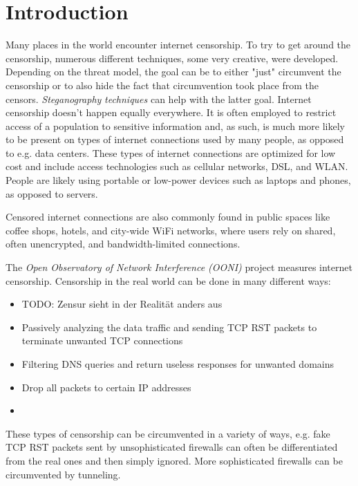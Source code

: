 
\chapter{Introduction}


Many places in the world encounter internet censorship.
To try to get around the censorship, numerous different techniques, some very creative, were developed.
Depending on the threat model, the goal can be to either "just" circumvent the censorship or to also hide the fact that circumvention took place from the censors.
\textit{Steganography} \cite{wiki:Steganography} \textit{techniques} \cite{wiki:List_of_steganography_techniques} can help with the latter goal.
Internet censorship doesn't happen equally everywhere.
It is often employed to restrict access of a population to sensitive information and, as such, is much more likely to be present on types of internet connections used by many people, as opposed to e.g. data centers.
These types of internet connections are optimized for low cost and include access technologies such as cellular networks, DSL, and WLAN.
People are likely using portable or low-power devices such as laptops and phones, as opposed to servers.

Censored internet connections are also commonly found in public spaces like coffee shops, hotels, and city-wide WiFi networks, where users rely on shared, often unencrypted, and bandwidth-limited connections.


The \textit{Open Observatory of Network Interference (OONI)} \cite{OONI} project measures internet censorship.
Censorship in the real world can be done in many different ways:
\begin{itemize}
  \item TODO: Zensur sieht in der Realität anders aus
  \item Passively analyzing the data traffic and sending TCP RST packets to terminate unwanted TCP connections
  \item Filtering DNS queries and return useless responses for unwanted domains
  \item Drop all packets to certain IP addresses
  \item {}
\end{itemize}
These types of censorship can be circumvented in a variety of ways, e.g. fake TCP RST packets sent by unsophisticated firewalls can often be differentiated from the real ones and then simply ignored.
More sophisticated firewalls can be circumvented by tunneling.

